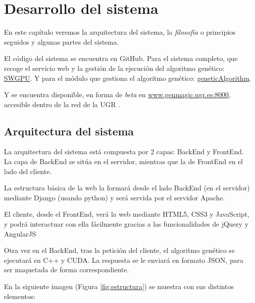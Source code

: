 \chapter{Desarrollo del sistema}

\bigskip
En este capítulo veremos la arquitectura del sistema, la \textit{filosofía} o principios seguidos y algunas partes del sistema.

\bigskip
El código del sistema se encuentra en GitHub. Para el sistema completo, que recoge el servicio web y la gestión de la ejecución del algoritmo genético: \textcolor{blue}{\href{https://github.com/JCristobal/SWGPU}{SWGPU}}. Y para el módulo que gestiona el algoritmo genético: \textcolor{blue}{\href{https://github.com/JCristobal/geneticAlgorithm}{geneticAlgorithm}}.

\bigskip
Y se encuentra disponible, en forma de \textit{beta} en  \textcolor{blue}{\href{http://www.genmagic.ugr.es:8000}{www.genmagic.ugr.es:8000}}, accesible dentro de la red de la UGR \cite{vpnugr}.

\bigskip
\section{Arquitectura del sistema}
\bigskip

La arquitectura del sistema está compuesta por 2 capas: BackEnd y FrontEnd. La capa de BackEnd se sitúa en el servidor, mientras que la de FrontEnd en el lado del cliente.

\bigskip
La estructura básica de la web la formará desde el lado BackEnd (en el servidor) mediante Django (usando python) y será servida por el servidor Apache. 

El cliente, desde el FrontEnd, verá la web mediante HTML5, CSS3 y JavaScript, y podrá interactuar con ella fácilmente gracias a las funcionalidades de jQuery y AngularJS

Otra vez en el BackEnd, tras la petición del cliente, el algoritmo genético se ejecutará en C++ y CUDA. La respuesta se le enviará en formato JSON, para ser maquetada de forma correspondiente.


\bigskip
En la siguiente imagen (Figura \ref{fig:estructura}) se muestra con sus distintos elementos:


